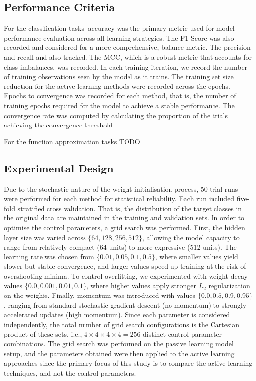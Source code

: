 \documentclass[10pt, conference]{IEEEtran}
\begin{document}
\subsection{Performance Criteria}
For the classification tasks, accuracy was the primary metric used for model performance evaluation across all learning strategies. The F1-Score was also recorded and considered for a more comprehensive, balance metric. The precision and recall and also tracked. The MCC, which is a robust metric that accounts for class imbalances, was recorded. In each training iteration, we record the number of training observations seen by the model as it trains. The training set size reduction for the active learning methods were recorded across the epochs. Epochs to convergence was recorded for each method, that is, the number of training epochs required for the model to achieve a stable performance. The convergence rate was computed by calculating the proportion of the trials achieving the convergence threshold.

For the function approximation tasks TODO

\subsection{Experimental Design}
Due to the stochastic nature of the weight initialisation process, 50 trial runs were performed for each method for statistical reliability. Each run included five-fold stratified cross validation. That is, the distribution of the target classes in the original data are maintained in the training and validation sets. In order to optimise the control parameters, a grid search was performed. First, the hidden layer size was varied across $\{64, 128, 256, 512\}$, allowing the model capacity to range from relatively compact (64 units) to more expressive (512 units). The learning rate was chosen from  $\{0.01, 0.05, 0.1, 0.5\}$, where smaller values yield slower but stable convergence, and larger values speed up training at the risk of overshooting minima. To control overfitting, we experimented with weight decay values $\{0.0, 0.001, 0.01, 0.1\}$, where higher values apply stronger $L_2$ regularization on the weights. Finally, momentum was introduced with values $\{0.0, 0.5, 0.9, 0.95\}$, ranging from standard stochastic gradient descent (no momentum) to strongly accelerated updates (high momentum). Since each parameter is considered independently, the total number of grid search configurations is the Cartesian product of these sets, i.e., $4 \times 4 \times 4 \times 4 = 256$ distinct control parameter combinations. The grid search was performed on the passive learning model setup, and the parameters obtained were then applied to the active learning approaches since the primary focus of this study is to compare the active learning techniques, and not the control parameters.
\end{document}
